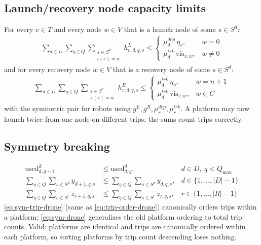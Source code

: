 \documentclass[10pt]{article}
\begin{document}
\subsection{Launch/recovery node capacity limits}
For every $v\in T$ and every node $w\in V$ that is a launch node of some
$s\in S^d$:
\begin{align}
\sum_{d\in D}\sum_{q\in Q}\sum_{\substack{s\in S^d\\ \iota(s)=w}} h^L_{v,d,q,s} \le
\begin{cases}
\mu^{dep}_d\,\eta_v, & w = 0\\
\mu^{trk}_d\,\mathrm{vis}_{v,w}, & w\ne 0
\end{cases} \label{eq:drone-launch-limit}
\end{align}
and for every recovery node $w\in V$ that is a recovery node of some $s\in S^d$:
\begin{align}
\sum_{d\in D}\sum_{q\in Q}\sum_{\substack{s\in S^r\\ \kappa(s)=w}} h^R_{v,d,q,s} \le
\begin{cases}
\mu^{trk}_d\,\eta_v, & w = n+1\\
\mu^{trk}_d\,\mathrm{vis}_{v,w}, & w\in C
\end{cases} \label{eq:drone-recovery-limit}
\end{align}
\noindent with the symmetric pair for robots using $g^L, g^R, \mu^{dep}_r,
\mu^{trk}_r$. A platform may now launch twice from one node on different
trips; the sums count trips correctly.

\subsection{Symmetry breaking}
\begin{align}
\mathrm{used}^d_{d,q+1} &\le \mathrm{used}^d_{d,q}, & d\in D,\ q<Q_{\max} \label{eq:sym-trip-drone}\\
\sum_{q\in Q}\sum_{s\in S^d} y_{d+1,q,s} &\le \sum_{q\in Q}\sum_{s\in S^d} y_{d,q,s}, & d\in\{1,\dots,|D|-1\} \label{eq:sym-drone}\\
\sum_{q\in Q}\sum_{s\in S^r} z_{r+1,q,s} &\le \sum_{q\in Q}\sum_{s\in S^r} z_{r,q,s}, & r\in\{1,\dots,|R|-1\} \label{eq:sym-robot}
\end{align}
\noindent \eqref{eq:sym-trip-drone} (same as \eqref{eq:trip-order-drone})
canonically orders trips within a platform; \eqref{eq:sym-drone} generalizes
the old platform ordering to total trip counts. Valid: platforms are identical
and trips are canonically ordered within each platform, so sorting platforms
by trip count descending loses nothing.
\end{document}
